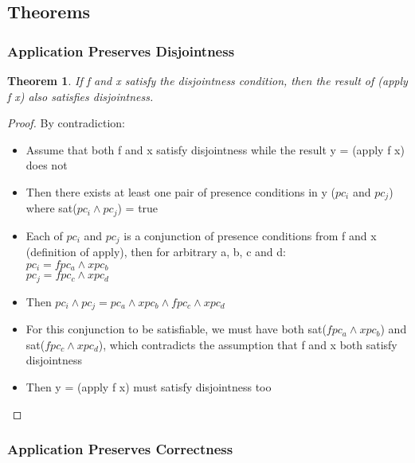 \documentclass[10pt,conference]{llncs}
\begin{document}

\subsection{Theorems}

\subsubsection{Application Preserves Disjointness}

\newtheorem{th1}{Theorem}
\begin{th1}
If f and x satisfy the disjointness condition, then the result of (apply f x) also satisfies disjointness.
\end{th1}

\begin{proof}

By contradiction:

\begin{itemize}
\item Assume that both f and x satisfy disjointness while the result y = (apply f x) does not
\item Then there exists at least one pair of presence conditions in y ($pc_i$ and $pc_j$) where sat($pc_i \wedge pc_j$) = true
\item Each of $pc_i$ and $pc_j$ is a conjunction of presence conditions from f and x (definition of apply), then for arbitrary a, b, c and d: \\
               $pc_i = fpc_a \wedge xpc_b$ \\
               $pc_j = fpc_c \wedge xpc_d$
\item Then $pc_i \wedge pc_j = pc_a \wedge xpc_b \wedge fpc_c \wedge xpc_d$
\item For this conjunction to be satisfiable, we must have both sat($fpc_a \wedge xpc_b$) and sat($fpc_c \wedge xpc_d$), which contradicts the assumption that f and x both satisfy disjointness
\item Then y = (apply f x) must satisfy disjointness too
\end{itemize}

\end{proof}

\subsubsection{Application Preserves Correctness}
\end{document}
